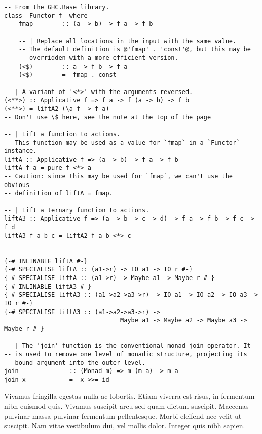\documentclass[oneside,openright,titlepage,numbers=noenddot,openany,headinclude,footinclude=true,
cleardoublepage=empty,abstractoff,BCOR=5mm,paper=a4,fontsize=12pt,main=spanish]{scrreprt}
\begin{document}
\begin{verbatim}
-- From the GHC.Base library.
class  Functor f  where
    fmap        :: (a -> b) -> f a -> f b

    -- | Replace all locations in the input with the same value.
    -- The default definition is @'fmap' . 'const'@, but this may be
    -- overridden with a more efficient version.
    (<$)        :: a -> f b -> f a
    (<$)        =  fmap . const

-- | A variant of '<*>' with the arguments reversed.
(<**>) :: Applicative f => f a -> f (a -> b) -> f b
(<**>) = liftA2 (\a f -> f a)
-- Don't use \$ here, see the note at the top of the page

-- | Lift a function to actions.
-- This function may be used as a value for `fmap` in a `Functor` instance.
liftA :: Applicative f => (a -> b) -> f a -> f b
liftA f a = pure f <*> a
-- Caution: since this may be used for `fmap`, we can't use the obvious
-- definition of liftA = fmap.

-- | Lift a ternary function to actions.
liftA3 :: Applicative f => (a -> b -> c -> d) -> f a -> f b -> f c -> f d
liftA3 f a b c = liftA2 f a b <*> c


{-# INLINABLE liftA #-}
{-# SPECIALISE liftA :: (a1->r) -> IO a1 -> IO r #-}
{-# SPECIALISE liftA :: (a1->r) -> Maybe a1 -> Maybe r #-}
{-# INLINABLE liftA3 #-}
{-# SPECIALISE liftA3 :: (a1->a2->a3->r) -> IO a1 -> IO a2 -> IO a3 -> IO r #-}
{-# SPECIALISE liftA3 :: (a1->a2->a3->r) ->
                                Maybe a1 -> Maybe a2 -> Maybe a3 -> Maybe r #-}

-- | The 'join' function is the conventional monad join operator. It
-- is used to remove one level of monadic structure, projecting its
-- bound argument into the outer level.
join              :: (Monad m) => m (m a) -> m a
join x            =  x >>= id
\end{verbatim}

Vivamus fringilla egestas nulla ac lobortis. Etiam viverra est risus,
in fermentum nibh euismod quis. Vivamus suscipit arcu sed quam dictum
suscipit. Maecenas pulvinar massa pulvinar fermentum
pellentesque. Morbi eleifend nec velit ut suscipit. Nam vitae
vestibulum dui, vel mollis dolor. Integer quis nibh sapien.




   
\end{document}
